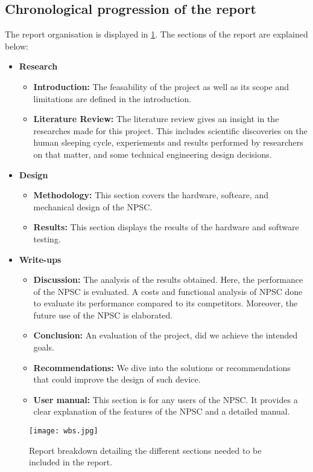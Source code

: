\subsection{Chronological progression of the report}
The report organisation is displayed in \cref{fig:wbs}. The sections of the report are explained below:
\begin{itemize}
\item \textbf{Research}
\begin{itemize}
\item \textbf{Introduction:} The feasability of the project as well as its scope and limitations are defined in the introduction. 
\item \textbf{Literature Review:} The literature review gives an insight in the researches made for this project. This includes scientific discoveries on the human sleeping cycle, experiements and results performed  by researchers on that matter, and some technical engineering design decisions. 
\end{itemize} 
\item \textbf{Design} 
\begin{itemize}
\item \textbf{Methodology:} This section covers the hardware, softeare, and mechanical design of the NPSC. 
\item \textbf{Results:} This section displays the results of the hardware and software testing. 
\end{itemize}
\item \textbf{Write-ups} 
\begin{itemize}
\item \textbf{Discussion:} The analysis of the results obtained. Here, the performance of the NPSC is evaluated. A costs and functional analysis of NPSC done to evaluate its performance compared to its competitors. Moreover, the future use of the NPSC is elaborated. 
\item \textbf{Conclusion:} An evaluation of the project, did we achieve the intended goals.
\item \textbf{Recommendations:} We dive into the solutions or recommendations that could improve the design of such device.
\item \textbf{User manual:} This section is for any users of the NPSC. It provides a clear explanation of the features of the NPSC and a detailed manual. 
\end{itemize}
\end{itemize}
\begin{landscape}
\begin{figure}[ht]
\centering
\texttt{[image: wbs.jpg]}
\caption{Report breakdown detailing the different sections needed to be included in the report.}
\label{fig:wbs}
\end{figure}
\end{landscape}
